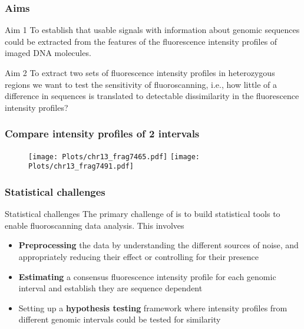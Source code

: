 \documentclass[10pt,dvipsnames,table]{beamer}
\begin{document}
\begin{frame}
\frametitle{Aims}
\begin{block}{Aim 1}
To establish that usable signals with information about genomic sequences could be extracted from the features of the fluorescence intensity profiles of imaged DNA molecules.
\end{block}
\vspace{1cm}
\begin{block}{Aim 2}
To extract two sets of fluorescence intensity profiles in heterozygous regions we want to test the sensitivity of fluoroscanning, i.e., how little of a difference in sequences is translated to detectable dissimilarity in the fluorescence intensity profiles?
\end{block}
\end{frame}

\begin{frame}
\frametitle{Compare intensity profiles of 2 intervals}
\begin{figure}[t]
\texttt{[image: Plots/chr13\_frag7465.pdf]}
\texttt{[image: Plots/chr13\_frag7491.pdf]}
\end{figure}
\end{frame}

\begin{frame}
\frametitle{Statistical challenges}
\begin{block}{Statistical challenges}
The primary challenge of is to build statistical tools to enable fluoroscanning data analysis. This involves
\begin{itemize}
\item {\bf{Preprocessing}} the data by understanding the different sources of noise, and appropriately reducing their effect or controlling for their presence
\item {\bf{Estimating}} a consensus fluorescence intensity profile for each genomic interval and establish they are sequence dependent
\item Setting up a {\bf{hypothesis testing}} framework where intensity profiles from different genomic intervals could be tested for similarity
\end{itemize}
\end{block}
\end{frame}
\end{document}
